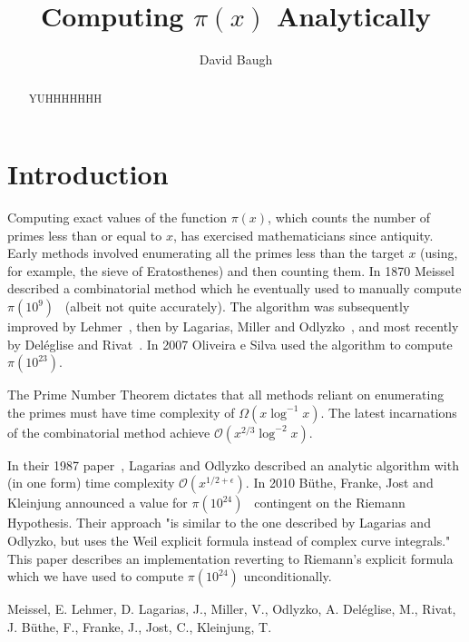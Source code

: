 \documentclass{amsart}
\title{Computing $\pi(x)$ Analytically}
\author{David Baugh}
\date{}
\begin{document}
\maketitle

\begin{abstract}
    YUHHHHHHH
\end{abstract}

\section{Introduction}


Computing exact values of the function $\pi(x)$, which counts the number of primes less than or equal to $x$, has exercised mathematicians since antiquity. Early methods involved enumerating all the primes less than the target $x$ (using, for example, the sieve of Eratosthenes) and then counting them. In 1870 Meissel~\cite{Meissel} described a combinatorial method which he eventually used to manually compute $\pi(10^9)$~\cite{Lehmer} (albeit not quite accurately). The algorithm was subsequently improved by Lehmer~\cite{Lehmer}, then by Lagarias, Miller and Odlyzko~\cite{Lagarias}, and most recently by Deléglise and Rivat~\cite{Deleglise}. In 2007 Oliveira e Silva used the algorithm to compute $\pi(10^{23})$.

The Prime Number Theorem dictates that all methods reliant on enumerating the primes must have time complexity of $\Omega(x\log^{-1} x)$. The latest incarnations of the combinatorial method achieve $\mathcal{O}(x^{2/3} \log^{-2} x)$.

In their 1987 paper~\cite{Lagarias}, Lagarias and Odlyzko described an analytic algorithm with (in one form) time complexity $\mathcal{O}(x^{1/2+\epsilon})$. In 2010 Büthe, Franke, Jost and Kleinjung announced a value for $\pi(10^{24})$~\cite{Buthe} contingent on the Riemann Hypothesis. Their approach "is similar to the one described by Lagarias and Odlyzko, but uses the Weil explicit formula instead of complex curve integrals." This paper describes an implementation reverting to Riemann’s explicit formula which we have used to compute $\pi(10^{24})$ unconditionally.

\begin{thebibliography}{99}
 Meissel, E.
 Lehmer, D.
 Lagarias, J., Miller, V., Odlyzko, A.
 Deléglise, M., Rivat, J.
 Büthe, F., Franke, J., Jost, C., Kleinjung, T.
\end{thebibliography}
\end{document}
